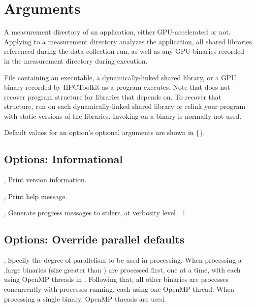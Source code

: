 \documentclass[english]{article}
\begin{document}
\section{Arguments}

\begin{Description}
\item[\Arg{measurement directory}]
A measurement directory of an application, either GPU-accelerated or not.
Applying  to a measurement directory analyzes the application, all shared libraries referenced
during the data-collection run, as well as any GPU binaries recorded 
in the measurement directory during execution. 

\item[\Arg{binary}] File containing an executable, a dynamically-linked shared library, or a GPU binary
recorded by HPCToolkit as a program executes.
Note that  does not recover program structure for libraries that  depends on.
To recover that structure, run  on each dynamically-linked shared library
or relink your program with static versions of the libraries.  Invoking  on a binary
is normally not used.

\end{Description}

Default values for an option's optional arguments are shown in \{\}.

\subsection{Options: Informational}

\begin{Description}

\item[\Opt{-V}, \Opt{--version}]
Print version information.

\item[\Opt{-h}, \Opt{--help}]
Print help message.

\item[\OptArg{-v}{num}, \OptArg{--verbose}{num}]
Generate progress messages to stderr, at verbosity level . {1}

\end{Description}

\subsection{Options: Override parallel defaults}
\item[\OptArg{-j}{num}, \OptArg{--jobs}{num}]
Specify the degree of parallelism to be used in processing.
When processing a ,large binaries (size greater than )
are processed first, one at a time, with each using
 OpenMP threads in .
Following that, all other binaries are processes concurrently with  
processes running, each using one OpenMP thread.
When processing a single binary,  OpenMP threads are used.
\end{document}
